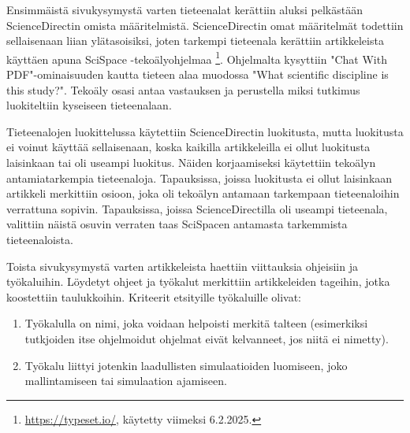 \documentclass[utf8]{gradu3}
\begin{document}
\begin{table}[h]
\centering
{}
\caption{Testauserän kategoriat}
\label{table: testausera}
\end{table}

Ensimmäistä sivukysymystä varten tieteenalat kerättiin aluksi 
pelkästään ScienceDirectin omista määritelmistä. 
ScienceDirectin omat määritelmät todettiin sellaisenaan liian ylätasoisiksi, 
joten tarkempi tieteenala kerättiin artikkeleista käyttäen apuna 
SciSpace -tekoälyohjelmaa 
\footnote{\url{https://typeset.io/}, käytetty viimeksi 6.2.2025.}. 
Ohjelmalta kysyttiin "Chat With PDF"-ominaisuuden 
kautta tieteen alaa muodossa "What scientific discipline is this study?". 
Tekoäly osasi antaa vastauksen ja perustella miksi tutkimus 
luokiteltiin kyseiseen tieteenalaan. 

Tieteenalojen luokittelussa käytettiin ScienceDirectin luokitusta, mutta
luokitusta ei voinut käyttää sellaisenaan, 
koska kaikilla artikkeleilla ei ollut luokitusta laisinkaan tai oli useampi luokitus. 
Näiden korjaamiseksi käytettiin tekoälyn antamiatarkempia tieteenaloja.
Tapauksissa, joissa luokitusta ei ollut laisinkaan artikkeli merkittiin osioon,
joka oli tekoälyn antamaan tarkempaan tieteenaloihin verrattuna sopivin.
Tapauksissa, joissa ScienceDirectilla oli useampi tieteenala, valittiin näistä
osuvin verraten taas SciSpacen antamasta tarkemmista tieteenaloista.

Toista sivukysymystä varten artikkeleista haettiin viittauksia ohjeisiin ja työkaluihin. Löydetyt ohjeet ja työkalut merkittiin artikkeleiden tageihin, jotka koostettiin taulukkoihin.
Kriteerit etsityille työkaluille olivat:
\begin{enumerate}
    \item Työkalulla on nimi, joka voidaan helpoisti merkitä talteen (esimerkiksi tutkjoiden itse ohjelmoidut ohjelmat eivät kelvanneet, jos niitä ei nimetty).
    \item Työkalu liittyi jotenkin laadullisten simulaatioiden luomiseen, joko
    mallintamiseen tai simulaation ajamiseen.
\end{enumerate}
\end{document}
